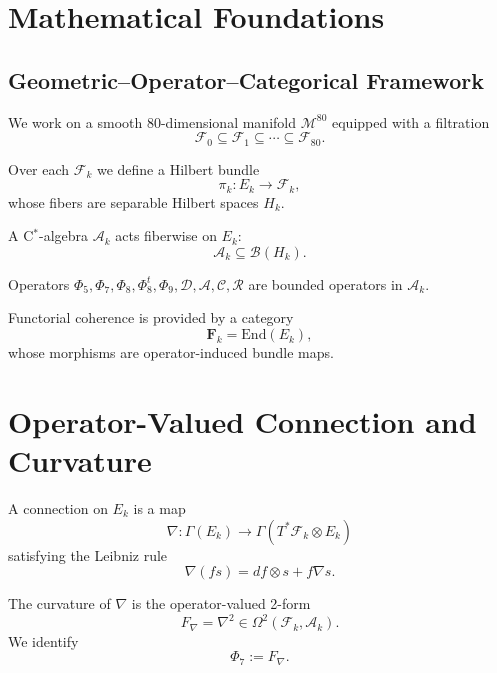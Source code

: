 
\appendix
\section{Mathematical Foundations}
\label{sec:DefensibleAppendix}

\subsection{Geometric–Operator–Categorical Framework}

We work on a smooth 80-dimensional manifold $\mathcal{M}^{80}$ equipped with a
filtration
\[
\mathcal{F}_0 \subseteq \mathcal{F}_1 \subseteq \cdots \subseteq \mathcal{F}_{80}.
\]

Over each $\mathcal{F}_k$ we define a Hilbert bundle
\[
\pi_k : E_k \to \mathcal{F}_k,
\]
whose fibers are separable Hilbert spaces $H_k$.

A C$^\ast$-algebra $\mathcal{A}_k$ acts fiberwise on $E_k$:
\[
\mathcal{A}_k \subseteq \mathcal{B}(H_k).
\]

Operators $\Phi_5, \Phi_7, \Phi_8, \Phi_8^t, \Phi_9, \mathcal{D}, \mathcal{A},
\mathcal{C}, \mathcal{R}$ are bounded operators in $\mathcal{A}_k$.

Functorial coherence is provided by a category
\[
\mathbf{F}_k = \mathrm{End}(E_k),
\]
whose morphisms are operator-induced bundle maps.

\section{Operator-Valued Connection and Curvature}

\begin{definition}
A connection on $E_k$ is a map
\[
\nabla : \Gamma(E_k) \to \Gamma(T^\ast\mathcal{F}_k \otimes E_k)
\]
satisfying the Leibniz rule
\[
\nabla(f s) = df \otimes s + f \nabla s.
\]
\end{definition}

\begin{definition}
The curvature of $\nabla$ is the operator-valued 2-form
\[
F_\nabla = \nabla^2 \in \Omega^2(\mathcal{F}_k, \mathcal{A}_k).
\]
We identify
\[
\Phi_7 := F_\nabla.
\]
\end{definition}


